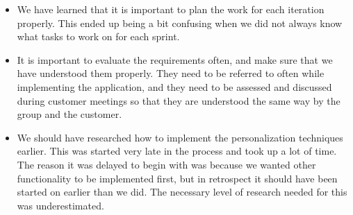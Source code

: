 \begin{itemize}
\item We have learned that it is important to plan the work for each iteration properly. This ended up being a bit confusing when we did not always know what tasks to work on for each sprint.

\item It is important to evaluate the requirements often, and make sure that we have understood them properly. They need to be referred to often while implementing the application, and they need to be assessed and discussed during customer meetings so that they are understood the same way by the group and the customer.

\item We should have researched how to implement the personalization techniques earlier. This was started very late in the process and took up a lot of time. The reason it was delayed to begin with was because we wanted other functionality to be implemented first, but in retrospect it should have been started on earlier than we did. The necessary level of research needed for this was underestimated.
\end{itemize}

\cleardoublepage